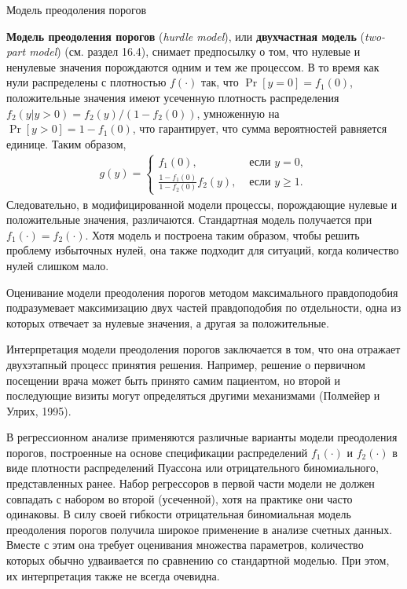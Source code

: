         \begin{center}{Модель преодоления порогов}\end{center} %
\noindent
\textbf{Модель преодоления порогов} (\textit{hurdle model}), или \textbf{двухчастная модель} (\textit{two-part model}) (см. раздел 16.4), снимает %
предпосылку о том, что нулевые и ненулевые значения порождаются одним и тем же процессом.
В то время как нули распределены с плотностью $f(\cdot)$ так, что $\Pr[y = 0] = f_1(0)$, положительные значения имеют усеченную плотность распределения $f_2(y|y > 0) = f_2(y) / (1 - f_2(0))$, умноженную на $\Pr[y > 0] = 1 - f_1(0)$, что гарантирует, что сумма вероятностей равняется единице. Таким образом,
    \begin{align}\label{eq:20.18}
    g(y) =\begin{cases}
                f_1(0),                                     & \text{ если }y = 0, \\
                \frac{1 - f_1(0)}{1 - f_2(0)} f_2(y),       & \text{ если }y \ge 1.
                \end{cases}
    \end{align}
Следовательно, в модифицированной модели процессы, порождающие нулевые и положительные значения, различаются. Стандартная модель получается при $f_1(\cdot) = f_2(\cdot)$. Хотя модель и построена таким образом, чтобы решить проблему избыточных нулей, она также подходит для ситуаций, когда количество нулей слишком мало.

Оценивание модели преодоления порогов методом максимального правдоподобия подразумевает максимизацию двух частей правдоподобия по отдельности, одна из которых отвечает за нулевые значения, а другая за положительные.

Интерпретация модели преодоления порогов заключается в том, что она отражает двухэтапный процесс принятия решения. Например, решение о первичном посещении врача может быть принято самим пациентом, но второй и последующие визиты могут определяться другими механизмами (Полмейер и Улрих, 1995).

В регрессионном анализе применяются различные варианты модели преодоления порогов, построенные на основе спецификации распределений $f_1(\cdot)$ и $f_2(\cdot)$ в виде плотности распределений Пуассона или отрицательного биномиального, представленных ранее. Набор регрессоров в первой части модели не должен совпадать с набором во второй (усеченной), хотя на практике они часто одинаковы. В силу своей гибкости отрицательная биномиальная модель преодоления порогов получила широкое применение в анализе счетных данных. Вместе с этим она требует оценивания множества параметров, количество которых обычно удваивается по сравнению со стандартной моделью. При этом, их интерпретация также не всегда очевидна.

